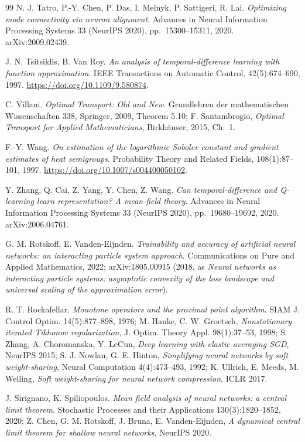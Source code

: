 \begin{thebibliography}{99}
N. J. Tatro, P.-Y. Chen, P. Das, I. Melnyk, P. Sattigeri, R. Lai.
\emph{Optimizing mode connectivity via neuron alignment}.
Advances in Neural Information Processing Systems 33 (NeurIPS 2020), pp.~15300--15311, 2020.
arXiv:2009.02439.

J. N. Tsitsiklis, B. Van Roy.
\emph{An analysis of temporal-difference learning with function approximation}.
IEEE Transactions on Automatic Control, 42(5):674--690, 1997.
\url{https://doi.org/10.1109/9.580874}.

C. Villani.
\emph{Optimal Transport: Old and New}.
Grundlehren der mathematischen Wissenschaften 338, Springer, 2009, Theorem 5.10;
F. Santambrogio, \emph{Optimal Transport for Applied Mathematicians}, Birkh\"auser, 2015, Ch.~1.

F.-Y. Wang.
\emph{On estimation of the logarithmic Sobolev constant and gradient estimates of heat semigroups}.
Probability Theory and Related Fields, 108(1):87--101, 1997.
\url{https://doi.org/10.1007/s004400050102}.

Y. Zhang, Q. Cai, Z. Yang, Y. Chen, Z. Wang.
\emph{Can temporal-difference and Q-learning learn representation? A mean-field theory}.
Advances in Neural Information Processing Systems 33 (NeurIPS 2020), pp.~19680--19692, 2020.
arXiv:2006.04761.

G. M. Rotskoff, E. Vanden-Eijnden.
\emph{Trainability and accuracy of artificial neural networks: an interacting particle system approach}.
Communications on Pure and Applied Mathematics, 2022; arXiv:1805.00915 (2018, as \emph{Neural networks as
interacting particle systems: asymptotic convexity of the loss landscape and universal scaling of the approximation error}).

R. T. Rockafellar.
\emph{Monotone operators and the proximal point algorithm}.
SIAM J. Control Optim. 14(5):877--898, 1976;
M. Hanke, C. W. Groetsch, \emph{Nonstationary iterated Tikhonov regularization}, J. Optim. Theory Appl. 98(1):37--53, 1998;
S. Zhang, A. Choromanska, Y. LeCun, \emph{Deep learning with elastic averaging SGD}, NeurIPS 2015;
S. J. Nowlan, G. E. Hinton, \emph{Simplifying neural networks by soft weight-sharing}, Neural Computation 4(4):473--493, 1992;
K. Ullrich, E. Meeds, M. Welling, \emph{Soft weight-sharing for neural network compression}, ICLR 2017.

J. Sirignano, K. Spiliopoulos.
\emph{Mean field analysis of neural networks: a central limit theorem}.
Stochastic Processes and their Applications 130(3):1820--1852, 2020;
Z. Chen, G. M. Rotskoff, J. Bruna, E. Vanden-Eijnden, \emph{A dynamical central limit theorem for shallow neural networks},
NeurIPS 2020.


\end{thebibliography}
